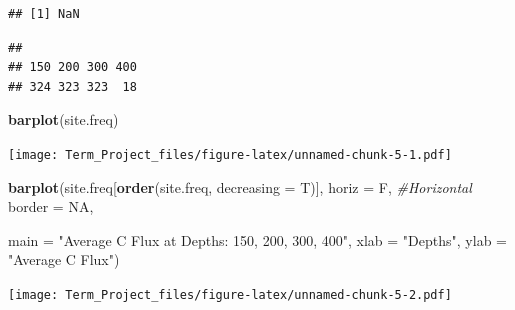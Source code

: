 \documentclass[]{article}
\newenvironment{Shaded}{\begin{snugshade}}{\end{snugshade}}
\newcommand{\CommentTok}[1]{\textcolor[rgb]{0.56,0.35,0.01}{\textit{#1}}}
\newcommand{\DataTypeTok}[1]{\textcolor[rgb]{0.13,0.29,0.53}{#1}}
\newcommand{\KeywordTok}[1]{\textcolor[rgb]{0.13,0.29,0.53}{\textbf{#1}}}
\newcommand{\NormalTok}[1]{#1}
\newcommand{\OperatorTok}[1]{\textcolor[rgb]{0.81,0.36,0.00}{\textbf{#1}}}
\newcommand{\OtherTok}[1]{\textcolor[rgb]{0.56,0.35,0.01}{#1}}
\newcommand{\StringTok}[1]{\textcolor[rgb]{0.31,0.60,0.02}{#1}}
\begin{document}
\begin{Shaded}
\end{Shaded}

\begin{verbatim}
## [1] NaN
\end{verbatim}

\begin{Shaded}
\end{Shaded}

\begin{verbatim}
## 
## 150 200 300 400 
## 324 323 323  18
\end{verbatim}

\begin{Shaded}
\begin{Highlighting}[]
\KeywordTok{barplot}\NormalTok{(site.freq)}
\end{Highlighting}
\end{Shaded}

\texttt{[image: Term\_Project\_files/figure-latex/unnamed-chunk-5-1.pdf]}

\begin{Shaded}
\begin{Highlighting}[]
\KeywordTok{barplot}\NormalTok{(site.freq[}\KeywordTok{order}\NormalTok{(site.freq, }\DataTypeTok{decreasing =}\NormalTok{ T)],}
        \DataTypeTok{horiz =}\NormalTok{ F,         }\CommentTok{#Horizontal}
        \DataTypeTok{border =} \OtherTok{NA}\NormalTok{,    }
        
        \DataTypeTok{main =} \StringTok{"Average C Flux at Depths: 150, 200, 300, 400"}\NormalTok{,}
        \DataTypeTok{xlab =} \StringTok{"Depths"}\NormalTok{, }\DataTypeTok{ylab =} \StringTok{"Average C Flux"}\NormalTok{)}
\end{Highlighting}
\end{Shaded}

\texttt{[image: Term\_Project\_files/figure-latex/unnamed-chunk-5-2.pdf]}
\end{document}
